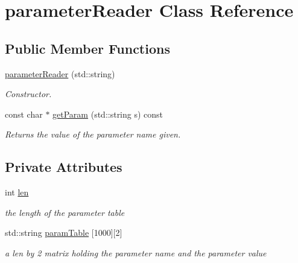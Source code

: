 \hypertarget{classparameterReader}{}\section{parameter\+Reader Class Reference}
\label{classparameterReader}
\subsection*{Public Member Functions}
\begin{DoxyCompactItemize}
\item 
\hyperlink{classparameterReader_a179677148e67505aeba03b350b72d0d6}{parameter\+Reader} (std\+::string)
\begin{DoxyCompactList}\small\item\em Constructor. \end{DoxyCompactList}\item 
const char $\ast$ \hyperlink{classparameterReader_ae5e3d2f04754357b25556f04cbe48b2e}{get\+Param} (std\+::string s) const
\begin{DoxyCompactList}\small\item\em Returns the value of the parameter name given. \end{DoxyCompactList}\end{DoxyCompactItemize}
\subsection*{Private Attributes}
\begin{DoxyCompactItemize}
\item 
\mbox{\label{classparameterReader_a72a2ac1e23e699b2f393193193d9dda7}} 
int \hyperlink{classparameterReader_a72a2ac1e23e699b2f393193193d9dda7}{len}
\begin{DoxyCompactList}\small\item\em the length of the parameter table \end{DoxyCompactList}\item 
\mbox{\label{classparameterReader_ac5b129418d06946c39462c2bf26aea54}} 
std\+::string \hyperlink{classparameterReader_ac5b129418d06946c39462c2bf26aea54}{param\+Table} \mbox{[}1000\mbox{]}\mbox{[}2\mbox{]}
\begin{DoxyCompactList}\small\item\em a len by 2 matrix holding the parameter name and the parameter value \end{DoxyCompactList}\end{DoxyCompactItemize}


